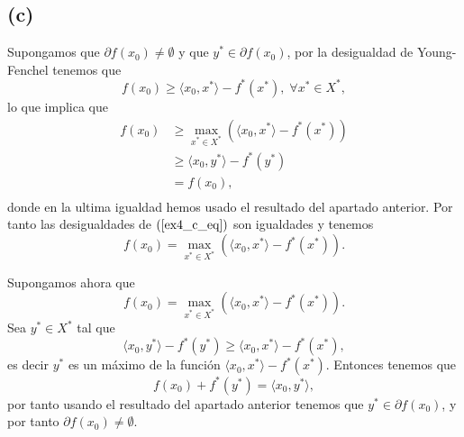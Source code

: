 \subsection*{(c)}

Supongamos que $\partial f(x_0) \neq \emptyset$ y que $y^* \in \partial f(x_0)$,
por la desigualdad de Young-Fenchel tenemos que
\begin{equation*}
    f(x_0) \geq \langle x_0, x^* \rangle - f^*(x^*), \; \forall x^* \in X^*,
\end{equation*}
lo que implica que
\begin{equation}\label{ex4_c_eq}
\begin{aligned}
    f(x_0) 
        & \geq \max_{x^* \in X^*} (\langle x_0, x^* \rangle - f^*(x^*)) \\
        & \geq \langle x_0, y^* \rangle - f^*(y^*) \\
        & = f(x_0), \\
\end{aligned}
\end{equation}
donde en la ultima igualdad hemos usado el resultado del apartado anterior.
Por tanto las desigualdades de $(\ref{ex4_c_eq})$ son igualdades y tenemos
\begin{equation*}
        f(x_0) = \max_{x^* \in X^*} (\langle x_0, x^* \rangle - f^*(x^*)).
\end{equation*}

Supongamos ahora que
\begin{equation*}
        f(x_0) = \max_{x^* \in X^*} (\langle x_0, x^* \rangle - f^*(x^*)).
\end{equation*}
Sea $y^* \in X^*$ tal que
\begin{equation*}
    \langle x_0, y^* \rangle - f^*(y^*) \geq \langle x_0, x^* \rangle - f^*(x^*),
\end{equation*}
es decir $y^*$ es un máximo de la función $\langle x_0, x^* \rangle - f^*(x^*)$.
Entonces tenemos que
\begin{equation*}
    f(x_0) + f^*(y^*) = \langle x_0, y^* \rangle,
\end{equation*}
por tanto usando el resultado del apartado anterior tenemos que $y^* \in \partial f(x_0)$,
y por tanto $\partial f(x_0) \neq \emptyset$.

